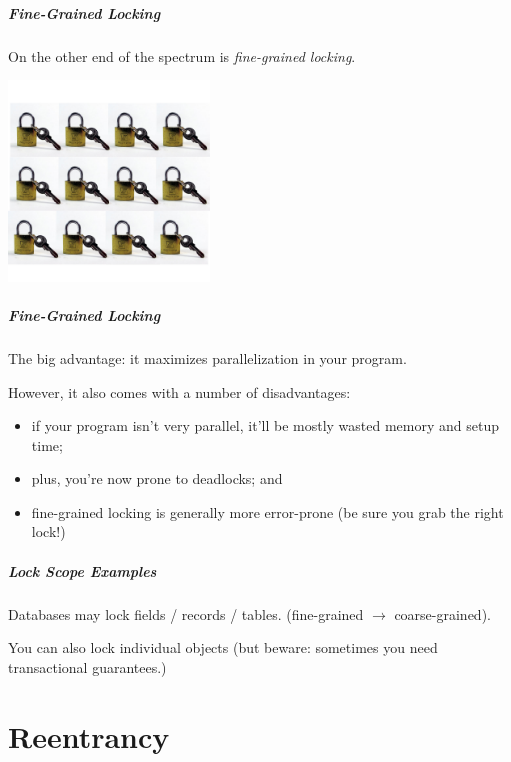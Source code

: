 \begin{frame}
\frametitle{Fine-Grained Locking}

On the other end of the spectrum is \emph{fine-grained locking}. 


\begin{center}
	\includegraphics[width=0.4\textwidth]{images/tinylocks.jpeg}
\end{center}


\end{frame}

\begin{frame}
\frametitle{Fine-Grained Locking} 

The big advantage: it maximizes parallelization in your program.

However, it also comes with a number of disadvantages:
  \begin{itemize}
    \item if your program isn't very parallel, it'll be mostly wasted memory and setup time;
    \item plus, you're now prone to deadlocks; and
    \item fine-grained locking is generally more error-prone (be sure you grab the right lock!)
  \end{itemize}

\end{frame}

\begin{frame}
\frametitle{Lock Scope Examples}


    Databases may lock fields / records / tables. (fine-grained $\rightarrow$ coarse-grained).

    You can also lock individual objects (but beware: sometimes you need transactional guarantees.)



\end{frame}

\part{Reentrancy}
\frame{\partpage}


